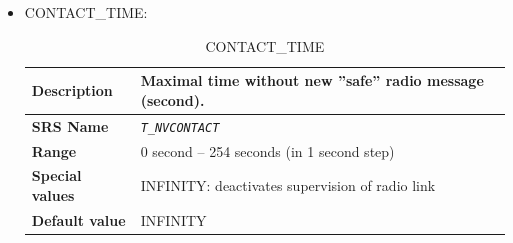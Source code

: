 \begin{itemize}
\begin{longtable}{|l|l|}
				\hline

			\end{longtable}

		\item CONTACT\_TIME:

			\begin{longtable}{|l|l|}
				\caption{CONTACT\_TIME}\\
				\hline

					\begin{minipage}[t]{0.22\linewidth} \textbf{Description}	\end{minipage}
				&	\begin{minipage}[t]{0.78\linewidth} Maximal time without new ”safe” radio message (second). \end{minipage} \\

				\hline

					\begin{minipage}[t]{0.22\linewidth} \textbf{SRS Name}	\end{minipage}
				&	\begin{minipage}[t]{0.78\linewidth} \emph{\texttt{T\_NVCONTACT}} \end{minipage} \\

				\hline

					\begin{minipage}[t]{0.22\linewidth} \textbf{Range}	\end{minipage}
				&	\begin{minipage}[t]{0.78\linewidth} 0 second – 254 seconds (in 1 second step) \end{minipage} \\

				\hline

					\begin{minipage}[t]{0.22\linewidth} \textbf{Special values}	\end{minipage}
				&	\begin{minipage}[t]{0.78\linewidth} INFINITY: deactivates supervision of radio link \end{minipage} \\

				\hline

					\begin{minipage}[t]{0.22\linewidth} \textbf{Default value}	\end{minipage}
				&	\begin{minipage}[t]{0.78\linewidth}	INFINITY \end{minipage} \\


\end{longtable}
\end{itemize}
